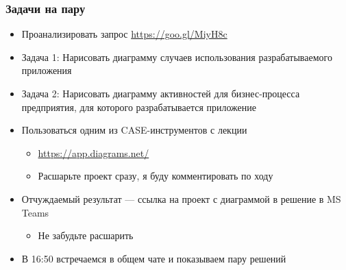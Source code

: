 \documentclass[xetex,mathserif,serif]{beamer}
\begin{document}
    \begin{frame}
        \frametitle{Задачи на пару}
        \begin{itemize}
            \item Проанализировать запрос \url{https://goo.gl/MiyH8c}
            \item Задача 1: Нарисовать диаграмму случаев использования разрабатываемого приложения
            \item Задача 2: Нарисовать диаграмму активностей для бизнес-процесса предприятия, для которого разрабатывается приложение
            \item Пользоваться одним из CASE-инструментов с лекции
            \begin{itemize}
                \item \url{https://app.diagrams.net/}
                \item Расшарьте проект сразу, я буду комментировать по ходу
            \end{itemize}
            \item Отчуждаемый результат --- ссылка на проект с диаграммой в решение в MS Teams
            \begin{itemize}
                \item Не забудьте расшарить
            \end{itemize}
            \item В 16:50 встречаемся в общем чате и показываем пару решений
        \end{itemize}
    \end{frame}
\end{document}
